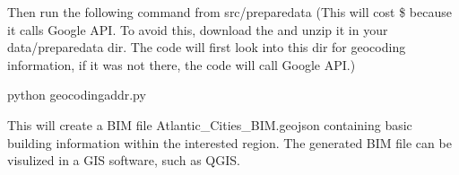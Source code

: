 \documentclass[letterpaper,10pt,english]{sphinxmanual}
\begin{document}
\sphinxAtStartPar
Then run the following command from src/preparedata (This will cost \$ because it calls Google API.
To avoid this, download the  and unzip it in your data/preparedata dir.
The code will first look into this dir for geocoding information, if it was not there, the code will call Google API.)

\begin{sphinxVerbatim}[commandchars=\\\{\}]
python geocoding\PYGZus{}addr.py
\end{sphinxVerbatim}

\sphinxAtStartPar
This will create a BIM file Atlantic\_Cities\_BIM.geojson containing basic building information within the interested region.
The generated BIM file can be visulized in a GIS software, such as QGIS.
\end{document}

